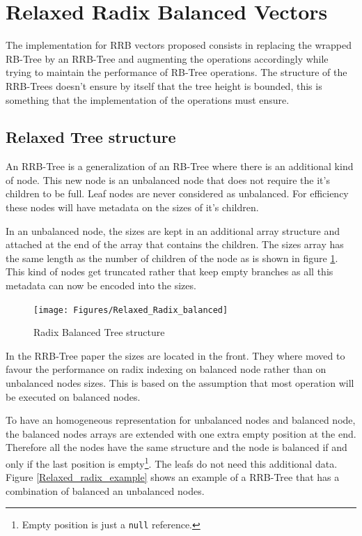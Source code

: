 \section{Relaxed Radix Balanced Vectors}
\label{RelaxedRadixBalancedVectors}

The implementation for RRB vectors proposed consists in replacing the wrapped RB-Tree by an RRB-Tree and augmenting the operations accordingly while trying to maintain the performance of RB-Tree operations. The structure of the RRB-Trees doesn't ensure by itself that the tree height is bounded, this is something that the implementation of the operations must ensure. 


\subsection{Relaxed Tree structure}
An RRB-Tree is a generalization of an RB-Tree where there is an additional kind of node. This new node is an unbalanced node that does not require the it's children to be full. Leaf nodes are never considered as unbalanced. For efficiency these nodes will have metadata on the sizes of it's children. 

In an unbalanced node, the sizes are kept in an additional array structure and attached at the end of the array that contains the children. The sizes array has the same length as the number of children of the node as is shown in figure \ref{Relaxed_Radix_balanced}. This kind of nodes get truncated rather that keep empty branches as all this metadata can now be encoded into the sizes.

\begin{figure}[h!]
  \centering
  \texttt{[image: Figures/Relaxed\_Radix\_balanced]}
  \caption{Radix Balanced Tree structure}
  \label{Relaxed_Radix_balanced}
\end{figure}

In the RRB-Tree paper \cite{RRBTrees} the sizes are located in the front. They where moved to favour the performance on radix indexing on balanced node rather than on unbalanced nodes sizes. This is based on the assumption that most operation will be executed on balanced nodes.

To have an homogeneous representation for unbalanced nodes and balanced node, the balanced nodes arrays are extended with one extra empty position at the end. Therefore all the nodes have the same structure and the node is balanced if and only if the last position is empty\footnote{Empty position is just a \texttt{null} reference.}. The leafs do not need this additional data. Figure \ref{Relaxed_radix_example} shows an example of a RRB-Tree that has a combination of balanced an unbalanced nodes.

